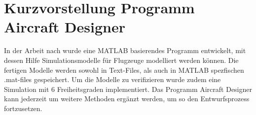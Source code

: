  \chapter{Kurzvorstellung Programm Aircraft Designer}
 In der Arbeit nach  \cite{Olucak.15.02.2017} wurde eine MATLAB basierendes Programm entwickelt, mit dessen Hilfe Simulationsmodelle für Flugzeuge modelliert werden können. Die fertigen Modelle werden sowohl in Text-Files, als auch in MATLAB spezfischen .mat-files gespeichert. Um die Modelle zu verifizieren wurde zudem eine Simulation mit 6 Freiheitsgraden implementiert. Das Programm Aircraft Designer kann jederzeit um weitere Methoden ergänzt werden, um so den Entwurfsprozess fortzusetzen.